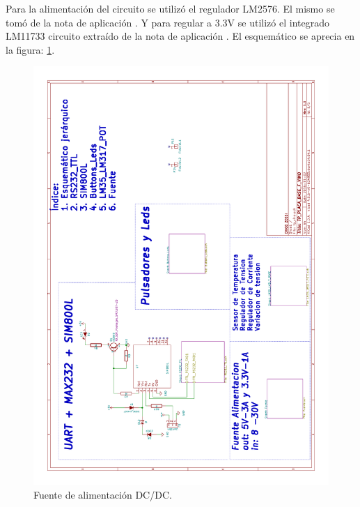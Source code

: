 Para la alimentación del circuito se utilizó el regulador LM2576. El mismo se tomó de la nota de aplicación \citep{Texas:LM2576}.
Y para regular a 3.3V se utilizó el integrado LM11733 circuito extraído de la nota de aplicación \citep{Texas:LM11733}. El esquemático se aprecia en la figura: \ref{fig:fuente}.
\begin{figure}[!hp]
  \centering
  \includegraphics[page=3,scale=0.7,angle=270,clip,trim=5cm 3cm 6.5cm 2.5cm]{./Figures/schematic.pdf}
  \caption{Fuente de alimentación DC/DC.}
  \label{fig:fuente}
\end{figure}

